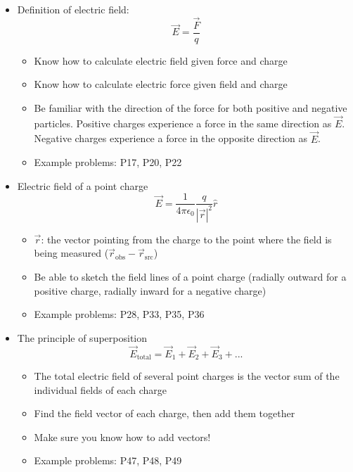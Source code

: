 \documentclass{article}
\begin{document}
\begin{itemize}
	\item Definition of electric field:
		\begin{equation*}
		\vec{E}=\frac{\vec{F}}{q}
		\end{equation*}
		\begin{itemize}
			\item Know how to calculate electric field given force and charge
			\item Know how to calculate electric force given field and charge
			\item Be familiar with the direction of the force for both positive and negative particles. Positive charges experience a force in the same direction as $\vec{E}$. Negative charges experience a force in the opposite direction as $\vec{E}$.
			\item Example problems: P17, P20, P22
		\end{itemize}
	
	\item Electric field of a point charge
		\begin{equation*}
		\vec{E}=\frac{1}{4\pi\epsilon_0}\frac{q}{|\vec{r}|^2}\hat{r}
		\end{equation*}
		\begin{itemize}
			\item $\vec{r}$: the vector pointing from the charge to the point where the field is being measured ($\vec{r}_\mathrm{obs}-\vec{r}_\mathrm{src}$)
			\item Be able to sketch the field lines of a point charge (radially outward for a positive charge, radially inward for a negative charge)
			\item Example problems: P28, P33, P35, P36
		\end{itemize}
	
	\item The principle of superposition
		\begin{equation*}
		\vec{E}_\mathrm{total}=\vec{E}_1+\vec{E}_2+\vec{E}_3+...
		\end{equation*}
		\begin{itemize}
		\item The total electric field of several point charges is the vector sum of the individual fields of each charge
		\item Find the field vector of each charge, then add them together
		\item Make sure you know how to add vectors!
		\item Example problems: P47, P48, P49
		\end{itemize}


\end{itemize}
\end{document}

